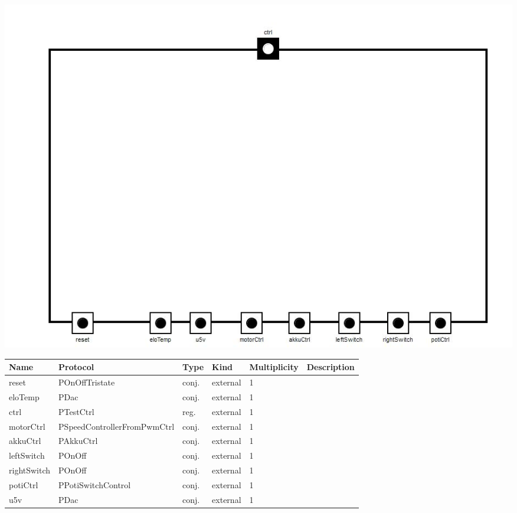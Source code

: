 
{
\centering{}
\includegraphics[width=1.0\textwidth]{./images/AEloTempTest_structure.jpg}
}

\begin{tabular}[ht]{|l|l|l|l|l|p{5cm}|}
\hline
\textbf{Name} & \textbf{Protocol} & \textbf{Type} & \textbf{Kind} & \textbf{Multiplicity} & \textbf{Description}\\
\hline
reset & POnOffTristate & conj. & external & 1 & \\
\hline
eloTemp & PDac & conj. & external & 1 & \\
\hline
ctrl & PTestCtrl & reg. & external & 1 & \\
\hline
motorCtrl & PSpeedControllerFromPwmCtrl & conj. & external & 1 & \\
\hline
akkuCtrl & PAkkuCtrl & conj. & external & 1 & \\
\hline
leftSwitch & POnOff & conj. & external & 1 & \\
\hline
rightSwitch & POnOff & conj. & external & 1 & \\
\hline
potiCtrl & PPotiSwitchControl & conj. & external & 1 & \\
\hline
u5v & PDac & conj. & external & 1 & \\
\hline
\end{tabular}

